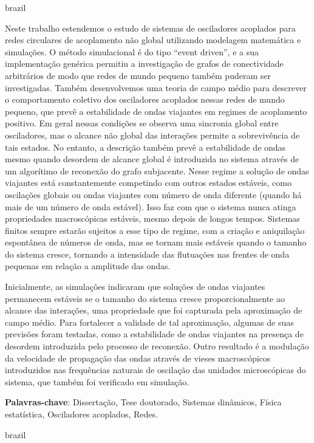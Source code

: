 \begin{otherlanguage*}{brazil}

Neste trabalho estendemos o estudo de sistemas de osciladores acoplados para redes circulares de acoplamento não global utilizando
modelagem matemática e simulações. O método simulacional é do tipo ``event driven'', e a sua implementação genérica permitiu a
investigação de grafos de conectividade arbitrários de modo que redes de mundo pequeno também puderam ser investigadas. Também
desenvolvemos uma teoria de campo médio para descrever o comportamento coletivo dos osciladores acoplados nessas redes de mundo
pequeno, que prevê a estabilidade de ondas viajantes em regimes de acoplamento positivo. Em geral nessas condições se observa uma
sincronia global entre osciladores, mas o alcance não global das interações permite a sobrevivência de tais estados. No entanto, a
descrição também prevê a estabilidade de ondas mesmo quando desordem de alcance global é introduzida no sistema através de um
algorítimo de reconexão do grafo subjacente. Nesse regime a solução de ondas viajantes está constantemente competindo com outros
estados estáveis, como oscilações globais ou ondas viajantes com número de onda diferente (quando há mais de um número de onda
estável). Isso faz com que o sistema nunca atinga propriedades macroscópicas estáveis, mesmo depois de longos tempos. Sistemas finitos
sempre estarão sujeitos a esse tipo de regime, com a criação e aniquilação espontânea de números de onda, mas se tornam mais estáveis
quando o tamanho do sistema cresce, tornando a intensidade das flutuações nas frentes de onda pequenas em relação a amplitude das
ondas.

Inicialmente, as simulações indicaram que soluções de ondas viajantes permanecem estáveis se o tamanho do sistema cresce
proporcionalmente ao alcance das interações, uma propriedade que foi capturada pela aproximação de campo médio. Para fortalecer a
validade de tal aproximação, algumas de suas previsões foram testadas, como a estabilidade de ondas viajantes na presença de desordem
introduzida pelo processo de reconexão. Outro resultado é a modulação da velocidade de propagação das ondas através de vieses
macroscópicos introduzidos nas frequências naturais de oscilação das unidades microscópicas do sistema, que também foi verificado em
simulação.

\vspace{\onelineskip}
 
\noindent 
\textbf{Palavras-chave}: Dissertação, Tese doutorado, Sistemas dinâmicos, Física estatística, Osciladores acoplados, Redes.
\end{otherlanguage*}{brazil}
